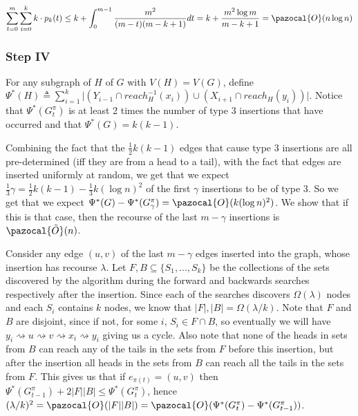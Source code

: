 \documentclass{article}
\begin{document}
\[ \sum_{t=0}^{m} \sum_{i=0}^{k}k \cdot p_{k}(t) \leq k + \int_{0}^{m-1} \frac{m^2}{(m-t)(m-k+1)} dt = k + \frac{m^2 \log m}{m-k+1} = \pazocal{O}(n \log n)\]



\subsubsection{Step IV}

For any subgraph of $H$ of $G$ with $V(H)=V(G)$, define $\Psi^{*}(H) \triangleq \sum_{i=1}^{k} \vert (Y_{i-1} \cap reach^{-1}_{H}(x_{i})) \cup (X_{i+1} \cap reach_{H}(y_{i})) \vert$. Notice that $\Psi^{*}(G_{t}^{\pi})$ is at least 2 times the number of type 3 insertions that have occurred and that $\Psi^{*}(G) = k(k-1)$.

Combining the fact that the $\frac{1}{2}k(k-1)$ edges that cause type 3 insertions are all pre-determined (iff they are from a head to a tail), with the fact that edges are inserted uniformly at random, we get that we expect $\frac{1}{3}\gamma = \frac{1}{2}k(k-1) - \frac{1}{3}k(\log n)^2$ of the first $\gamma$ insertions to be of type 3. So we get that we expect $\Psi^{*}(G)-\Psi^{*}(G_{\gamma}^{\pi}) = \pazocal{O}(k(\log n)^2)$. We show that if this is that case, then the recourse of the last $m-\gamma$ insertions is $\pazocal{\tilde{O}}(n)$.

Consider any edge $(u,v)$ of the last $m - \gamma$ edges inserted into the graph, whose insertion has recourse $\lambda$. Let $F,B \subseteq \{S_{1},...,S_{k}\}$ be the collections of the sets discovered by the algorithm during the forward and backwards searches respectively after the insertion. Since each of the searches discovers $\Omega(\lambda)$ nodes and each $S_{i}$ contains $k$ nodes, we know that $\vert F \vert, \vert B \vert = \Omega(\lambda/k)$. Note that $F$ and $B$ are disjoint, since if not, for some $i$, $S_{i} \in F \cap B$, so eventually we will have $y_{i} \rightsquigarrow u \rightsquigarrow v \rightsquigarrow x_{i} \rightsquigarrow y_{i}$ giving us a cycle. Also note that none of the heads in sets from $B$ can reach any of the tails in the sets from $F$ before this insertion, but after the insertion all heads in the sets from $B$ can reach all the tails in the sets from $F$. This gives us that if $e_{\pi(t)}=(u,v)$ then $\Psi^{*}(G_{t-1}^{\pi}) + 2\vert F \vert\vert B \vert \leq \Psi^{*}(G_{t}^{\pi})$, hence $(\lambda/k)^2 = \pazocal{O}(\vert F \vert\vert B \vert) = \pazocal{O}(\Psi^{*}(G_{t}^{\pi}) - \Psi^{*}(G_{t-1}^{\pi}))$.
\end{document}
